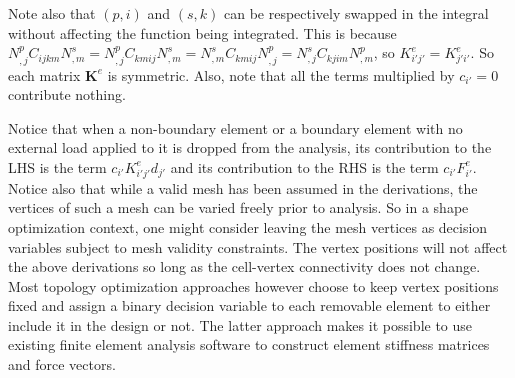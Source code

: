 	Note also that $(p,i)$ and $(s,k)$ can be respectively swapped in the integral without affecting the function being integrated. This is because $N^p_{,j}C_{ijkm}N^s_{,m} = N^p_{,j}C_{kmij}N^s_{,m} = N^s_{,m}C_{kmij}N^p_{,j} = N^s_{,j}C_{kjim}N^p_{,m}$, so $K^e_{i'j'} = K^e_{j'i'}$. So each matrix $\bm{K}^e$ is symmetric. Also, note that all the terms multiplied by $c_{i'} = 0$ contribute nothing.

	Notice that when a non-boundary element or a boundary element with no external load applied to it is dropped from the analysis, its contribution to the LHS is the term $c_{i'} K^e_{i'j'} d_{j'}$ and its contribution to the RHS is the term $c_{i'} F^e_{i'}$. Notice also that while a valid mesh has been assumed in the derivations, the vertices of such a mesh can be varied freely prior to analysis. So in a shape optimization context, one might consider leaving the mesh vertices as decision variables subject to mesh validity constraints. The vertex positions will not affect the above derivations so long as the cell-vertex connectivity does not change. Most topology optimization approaches however choose to keep vertex positions fixed and assign a binary decision variable to each removable element to either include it in the design or not. The latter approach makes it possible to use existing finite element analysis software to construct element stiffness matrices and force vectors.

